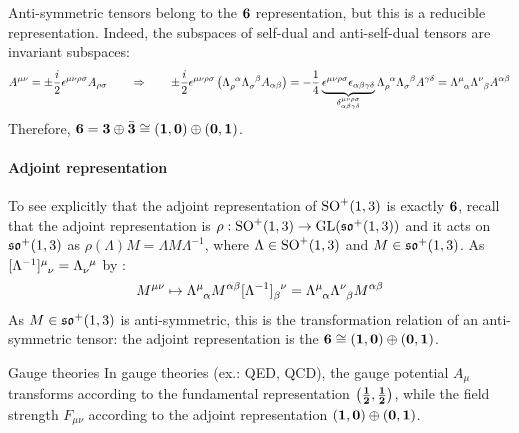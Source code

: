 Anti-symmetric tensors belong to the $ \mathbf{6} $ representation, but this is a reducible representation. Indeed, the subspaces of self-dual and anti-self-dual tensors are invariant subspaces:
\begin{equation*}
  A^{\mu \nu} = \pm \frac{i}{2} \epsilon^{\mu \nu \rho \sigma} A_{\rho \sigma}
  \qquad \Rightarrow \qquad
  \pm \frac{i}{2} \epsilon^{\mu \nu \rho \sigma} \left( \tensor{\Lambda}{_\rho^\alpha} \tensor{\Lambda}{_\sigma^\beta} A_{\alpha \beta} \right) = - \frac{1}{4} \underbrace{\epsilon^{\mu \nu \rho \sigma} \epsilon_{\alpha \beta \gamma \delta}}_{\delta^{\mu \nu \rho \sigma}_{\alpha \beta \gamma \delta}} \tensor{\Lambda}{_\rho^\alpha} \tensor{\Lambda}{_\sigma^\beta} A^{\gamma \delta} = \tensor{\Lambda}{^\mu_\alpha} \tensor{\Lambda}{^\nu_\beta} A^{\alpha \beta}
\end{equation*}
Therefore, $ \mathbf{6} = \mathbf{3} \oplus \bar{\mathbf{3}} \cong \mathbf{\left( 1,0 \right)} \oplus \mathbf{\left( 0,1 \right)} $.

\paragraph{Adjoint representation}

To see explicitly that the adjoint representation of $ \mathrm{SO}^+(1,3) $ is exactly $ \mathbf{6} $, recall that the adjoint representation is $ \rho : \mathrm{SO}^+(1,3) \rightarrow \mathrm{GL}(\mathfrak{so}^+(1,3)) $ and it acts on $ \mathfrak{so}^+(1,3) $ as $ \rho(\Lambda) M = \Lambda M \Lambda^{-1} $, where $ \Lambda \in \mathrm{SO}^+(1,3) $ and $ M \in \mathfrak{so}^+(1,3) $. As $ \tensor{[\Lambda^{-1}]}{^\mu_\nu} = \tensor{\Lambda}{_\nu^\mu} $ by :
\begin{equation*}
  M^{\mu \nu} \mapsto \tensor{\Lambda}{^\mu_\alpha} M^{\alpha \beta} \tensor{[\Lambda^{-1}]}{_\beta^\nu} = \tensor{\Lambda}{^\mu_\alpha} \tensor{\Lambda}{^\nu_\beta} M^{\alpha \beta}
\end{equation*}
As $ M \in \mathfrak{so}^+(1,3) $ is anti-symmetric, this is the transformation relation of an anti-symmetric tensor: the adjoint representation is the $ \mathbf{6} \cong \mathbf{\left( 1,0 \right)} \oplus \mathbf{\left( 0,1 \right)} $.

\begin{example}{Gauge theories}{}
  In gauge theories (ex.: QED, QCD), the gauge potential $ A_\mu $ transforms according to the fundamental representation $ \mathbf{\left( \frac{1}{2},\frac{1}{2} \right)} $, while the field strength $ F_{\mu \nu} $ according to the adjoint representation $ \mathbf{\left( 1,0 \right)} \oplus \mathbf{\left( 0,1 \right)} $.
\end{example}


